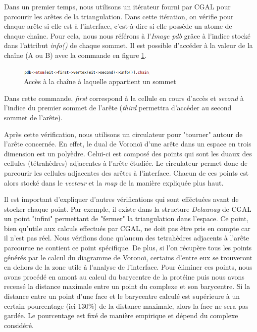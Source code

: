 Dans un premier temps, nous utilisons un itérateur fourni par CGAL pour parcourir
les arêtes de la triangulation. Dans cette itération, on vérifie pour chaque arête
si elle est à l'interface, c'est-à-dire
si elle possède un atome de chaque chaîne. Pour cela, nous nous référons à l'\textit{Image pdb}
grâce à l'indice stocké dans l'attribut \textit{info()} de chaque sommet. Il est possible
d'accéder à la valeur de la chaîne (A ou B) avec la commande en figure \ref{fig::access_chain}.
\begin{figure}[ht]
\centering
  \includegraphics[width=0.6\textwidth]{figures/access_chain.png}
  \caption{Accès à la chaîne à laquelle appartient un sommet}
  \label{fig::access_chain}
\end{figure}
Dans cette commande, \textit{first} correspond à la cellule en cours d'accès et
\textit{second} à l'indice du premier sommet de l'arête (\textit{third} permettra
d'accéder au second sommet de l'arête).

Après cette vérification, nous utilisons un circulateur pour "tourner" autour de l'arête
concernée. En effet, le dual de Voronoï d'une arête dans un espace en trois dimension
est un polyèdre. Celui-ci est composé des points qui sont les duaux des cellules (tétrahèdres)
adjacentes à l'arête étudiée. Le circulateur permet donc de parcourir les cellules adjacentes
des arêtes à l'interface. Chacun de ces points est alors stocké dans le \textit{vecteur} et
la \textit{map} de la manière expliquée plus haut.

Il est important d'expliquer d'autres vérifications qui sont efféctuées avant de stocker
chaque point. Par exemple, il existe dans la structure \textit{Delaunay} de CGAL
un point "infini" permettant de "fermer" la triangulation dans l'espace. Ce point, bien
qu'utile aux calculs effectués par CGAL, ne doit pas être pris en compte car il n'est pas réel.
Nous vérifions donc qu'aucun des tetrahèdres adjacents à l'arête parcourue ne contient
ce point spécifique. De plus, si l'on récupère tous les points générés par le calcul du
diagramme de Voronoï, certains d'entre eux se trouveront en dehors de la zone utile à l'analyse
de l'interface. Pour éliminer ces points, nous avons procédé en amont au calcul
du barycentre de la protéine puis nous avons recensé la distance maximale entre un point du complexe
et son barycentre. Si la distance entre un point d'une face et le barycentre calculé
est supérieure à un certain pourcentage (ici 130\%) de la distance maximale, alors
la face ne sera pas gardée. Le pourcentage est fixé de manière empirique et dépend
du complexe considéré.


